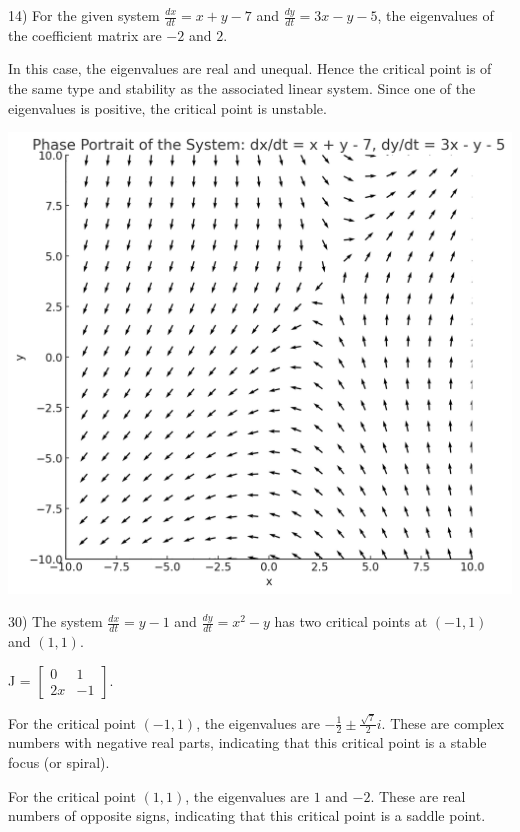 \documentclass{article}
\begin{document}
14) For the given system $\frac{dx}{dt} = x + y - 7$ and
$\frac{dy}{dt} = 3x - y - 5$, the eigenvalues of the coefficient matrix are
$-2$ and $2$.

In this case, the eigenvalues are real and unequal. Hence the critical point
is of the same type and stability as the associated linear system. Since one
of the eigenvalues is positive, the critical point is unstable.

\includegraphics[width=\linewidth]{6_2_14}

30) The system $\frac{dx}{dt} = y - 1$ and $\frac{dy}{dt} = x^2 - y$
has two critical points at $(-1, 1)$ and $(1, 1)$.

J = $\begin{bmatrix}
    0 & 1 \\
    2x & -1
\end{bmatrix}$.

For the critical point $(-1, 1)$, the eigenvalues
are $-\frac{1}{2} \pm \frac{\sqrt{7}}{2} i$.
These are complex numbers with negative real parts, indicating that
this critical point is a stable focus (or spiral).

For the critical point $(1, 1)$, the eigenvalues are
$1$ and $-2$. These are real numbers of opposite signs, indicating that
this critical point is a saddle point.
\end{document}
